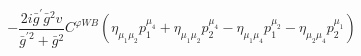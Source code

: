 %
\begin{dmath*}
%
  -  \frac{2 i {\bar g}^\prime {\bar g}{}^2 v}{{\bar g}^{\prime 2} + {\bar g}{}^2}C^{ \varphi  WB} \left(\eta_{\mu_1 \mu_2} p_1^{\mu_4} + \eta_{\mu_1 \mu_2} p_2^{\mu_4} - \eta_{\mu_1 \mu_4} p_1^{\mu_2} - \eta_{\mu_2 \mu_4} p_2^{\mu_1}\right)
%
\end{dmath*}
%
